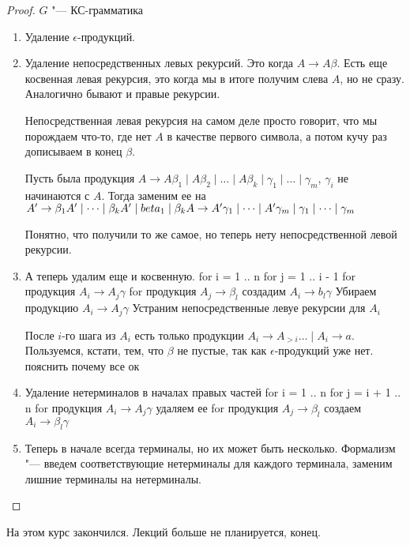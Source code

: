 \begin{proof}
$G$ "--- КС-грамматика

\begin{enumerate}
\item
Удаление $\epsilon$-продукций.

\item
Удаление непосредственных левых рекурсий. Это когда $A \to A \beta$. 
Есть еще косвенная левая рекурсия, это когда мы в итоге получим слева $A$, но не сразу.
Аналогично бывают и правые рекурсии.

Непосредственная левая рекурсия на самом деле просто говорит, что мы порождаем что-то, где нет $A$ в качестве первого символа, а потом кучу раз дописываем в конец $\beta$.

Пусть была продукция $A \to A \beta_1 \mid A\beta_2 \mid \dots \mid A \beta_k \mid \gamma_1 \mid \dots \mid \gamma_m$, $\gamma_i$ не начинаются с $A$.
Тогда заменим ее на $\\
A' \to \beta_1 A' \mid \dots \mid \beta_k A' \mid beta_1 \mid \beta_k \\
A \to A' \gamma_1 \mid \dots \mid A' \gamma_m \mid \gamma_1 \mid \dots \mid \gamma_m$ 

Понятно, что получили то же самое, но теперь нету непосредственной левой рекурсии.

\item
А теперь удалим еще и косвенную.
for i = 1 .. n
    for j = 1 .. i - 1
        for продукция $A_i \to A_j \gamma$
            for продукция $A_j \to \beta_l$
                создадим $A_i \to b_l \gamma$
            Убираем продукцию $A_i \to A_j \gamma$
    Устраним непосредственные левуе рекурсии для $A_i$

После $i$-го шага из $A_i$ есть только продукции $A_i \to A_{>i} \dots \mid A_i \to a$.
Пользуемся, кстати, тем, что $\beta$ не пустые, так как $\epsilon$-продукций уже нет.
\TODO пояснить почему все ок

\item
Удаление нетерминалов в началах правых частей
for i = 1 .. n
    for j = i + 1 .. n
        for продукция $A_i \to A_j \gamma$
            удаляем ее
            for продукция $A_j \to \beta_l$
                создаем $A_i \to \beta_l \gamma$

\item
Теперь в начале всегда терминалы, но их может быть несколько.
Формализм "--- введем соответствующие нетерминалы для каждого терминала, заменим лишние терминалы на нетерминалы.     

\end{enumerate}
\end{proof}

На этом курс закончился. Лекций больше не планируется, конец.
